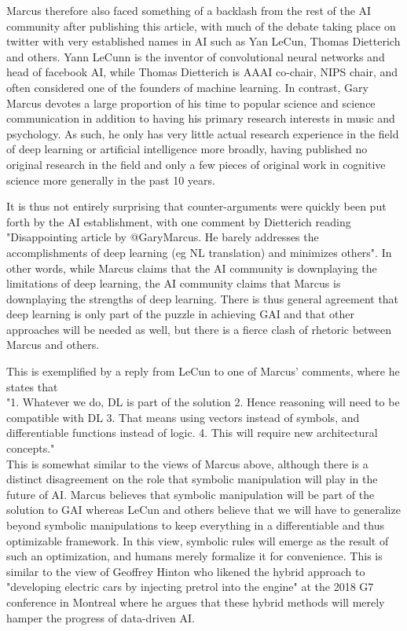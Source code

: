 \documentclass{article}
\begin{document}
Marcus therefore also faced something of a backlash from the rest of the AI community after publishing this article, with much of the debate taking place on twitter with very established names in AI such as Yan LeCun, Thomas Dietterich and others. Yann LeCunn is the inventor of convolutional neural networks and head of facebook AI, while Thomas Dietterich is AAAI co-chair, NIPS chair, and often considered one of the founders of machine learning. In contrast, Gary Marcus devotes a large proportion of his time to popular science and science communication in addition to having his primary research interests in music and psychology. As such, he only has very little actual research experience in the field of deep learning or artificial intelligence more broadly, having published no original research in the field and only a few pieces of original work in cognitive science more generally in the past 10 years.

It is thus not entirely surprising that counter-arguments were quickly been put forth by the AI establishment, with one comment by Dietterich reading "Disappointing article by @GaryMarcus. He barely addresses the accomplishments of deep learning (eg NL translation) and minimizes others". In other words, while Marcus claims that the AI community is downplaying the limitations of deep learning, the AI community claims that Marcus is downplaying the strengths of deep learning. There is thus general agreement that deep learning is only part of the puzzle in achieving GAI and that other approaches will be needed as well, but there is a fierce clash of rhetoric between Marcus and others.

This is exemplified by a reply from LeCun to one of Marcus' comments, where he states that\\
"1. Whatever we do, DL is part of the solution 2. Hence reasoning will need to be compatible with DL 3. That means using vectors instead of symbols, and differentiable functions instead of logic. 4. This will require new architectural concepts." \\
This is somewhat similar to the views of Marcus above, although there is a distinct disagreement on the role that symbolic manipulation will play in the future of AI. Marcus believes that symbolic manipulation will be part of the solution to GAI whereas LeCun and others believe that we will have to generalize beyond symbolic manipulations to keep everything in a differentiable and thus optimizable framework. In this view, symbolic rules will emerge as the result of such an optimization, and humans merely formalize it for convenience. This is similar to the view of Geoffrey Hinton who likened the hybrid approach to "developing electric cars by injecting pretrol into the engine" at the 2018 G7 conference in Montreal where he argues that these hybrid methods will merely hamper the progress of data-driven AI.
\end{document}
